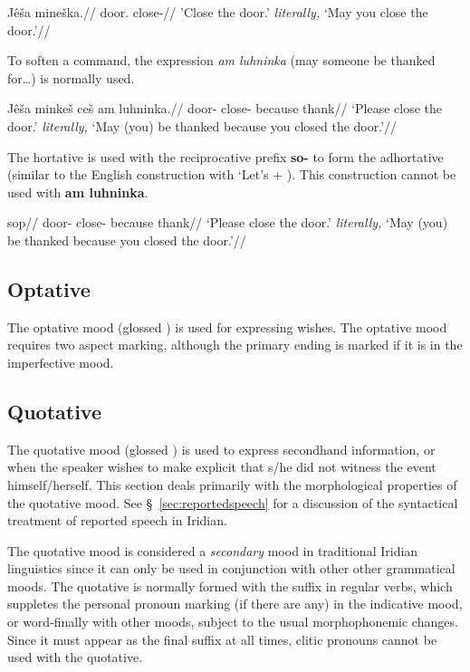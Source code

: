	\pex
\begingl
\gla Jê\v{s}a mine\v{s}ka.//
\glb door. close-//
\glft 'Close the door.' \textit{literally,} `May you close the door.'//
\endgl
\xe

\par To soften a command, the expression \textit{am luhninka} (may someone be thanked for\ldots) is normally used.

\pex
\begingl
\gla Jê\v{s}a minke\v{s} ce\v{s} am luhninka.//
\glb door- close-  because thank//
\glft  `Please close the door.' \textit{literally,} `May (you) be thanked because you closed the door.'//
\endgl
\xe

\par The hortative is used with the reciprocative prefix \textbf{so-} to form the adhortative (similar to the English construction with `Let's + ). This construction cannot be used with \textbf{am luhninka}.

\pex
\begingl
\gla sop//
\glb door- close-  because thank//
\glft  `Please close the door.' \textit{literally,} `May (you) be thanked because you closed the door.'//
\endgl
\xe

\subsection{Optative}
The optative mood (glossed ) is used for expressing wishes. The optative mood requires two aspect marking, although the primary ending is marked if it is in the imperfective mood.



\subsection{Quotative}\label{sec:quotative}
\par The quotative mood (glossed ) is used to express secondhand information, or when the speaker wishes to make explicit that s/he did not witness the event himself/herself. This section deals primarily with the morphological properties of the quotative mood. See \S~\ref{sec:reportedspeech} for a discussion of the syntactical treatment of reported speech in Iridian.

The quotative mood is considered a \emph{secondary} mood in traditional Iridian linguistics since it can only be used in conjunction with other other grammatical moods. The quotative is normally formed with the suffix  in regular verbs, which suppletes the personal pronoun marking (if there are any) in the indicative mood, or word-finally with other moods, subject to the usual morphophonemic changes. Since it must appear as the final suffix at all times, clitic pronouns cannot be used with the quotative.


